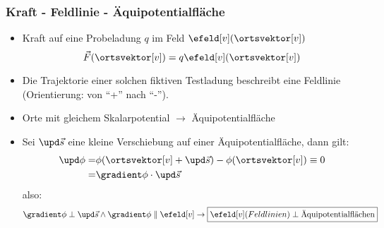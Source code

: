 \begin{frame}
\frametitle{Kraft - Feldlinie - Äquipotentialfläche}

\begin{itemize}[<+->]
\item Kraft auf eine Probeladung $q$ im Feld $\efeld[v](\ortsvektor[v])$
$$
\vec{F}(\ortsvektor[v]) = q \efeld[v](\ortsvektor[v])
$$ 
\item Die \alert{Trajektorie} einer solchen fiktiven Testladung
  beschreibt eine \alert{Feldlinie} (Orientierung: von \enquote{+}
  nach \enquote{-}). 
\item Orte mit gleichem Skalarpotential $\to$
  \alert{Äquipotentialfläche}
\item Sei $\upd\vec{s}$ eine kleine Verschiebung auf einer
  Äquipotentialfläche, dann gilt:
\begin{align*}
\upd \phi = & \phi(\ortsvektor[v]+\upd\vec{s}) - \phi(\ortsvektor[v]) \equiv 0\\
 = & \gradient \phi \cdot \upd\vec{s}
\end{align*}
also:
$$
\gradient \phi \perp \upd\vec{s} \land \gradient \phi \parallel \efeld[v] \to
\boxed{\efeld[v] (Feldlinien) \perp \text{Äquipotentialflächen}}  
$$
\end{itemize}

\end{frame}

